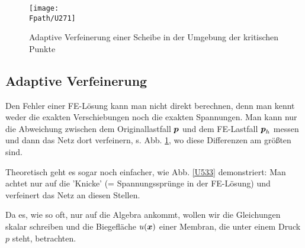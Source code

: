 {%
\begin{figure}[tbp]
\centering
\if {} \sidecaption[t] \fi
\texttt{[image: \\Fpath/U271]}
\caption{Adaptive Verfeinerung einer Scheibe in der Umgebung der kritischen Punkte} \label{U271}
\end{figure}%

{\textcolor{sectionTitleBlue}{\section{Adaptive Verfeinerung}}}\label{SecAdaptiveVerfeinerung}
Den Fehler einer FE-L\"{o}sung kann man nicht direkt berechnen, denn man kennt weder die exakten Verschiebungen noch die exakten Spannungen. Man kann nur die Abweichung zwischen dem Originallastfall $\mbox{\boldmath $p$}$ und dem FE-Lastfall $\mbox{\boldmath $p$}_h$ messen und dann das Netz dort verfeinern, s. Abb. \ref{U271}, wo diese Differenzen am gr\"{o}{\ss}ten sind.

Theoretisch geht es sogar noch einfacher, wie Abb. \ref{U533} demonstriert: Man achtet nur auf die 'Knicke' (= Spannungsspr\"{u}nge in der FE-L\"{o}sung) und verfeinert das Netz an diesen Stellen.

Da es, wie so oft, nur auf die Algebra ankommt, wollen wir die Gleichungen skalar schreiben und die Biegefl\"{a}che $u(\mbox{\boldmath $x$})$ einer Membran, die unter einem Druck $p$ steht, betrachten.

}
